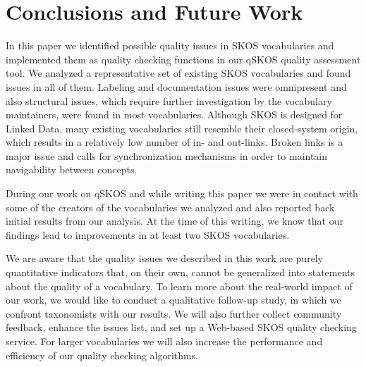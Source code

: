 \section{Conclusions and Future Work}\label{sec:conclusions}

In this paper we identified possible quality issues in SKOS vocabularies and implemented them as quality checking functions in our qSKOS quality assessment tool. We analyzed a representative set of existing SKOS vocabularies and found  issues in all of them. Labeling and documentation issues were omnipresent and also structural issues, which require further investigation by the vocabulary maintainers, were found in most vocabularies. Although SKOS is designed for Linked Data, many existing vocabularies still resemble their closed-system origin, which results in a relatively low number of in- and out-links. Broken links is a major issue and calls for synchronization mechanisms in order to maintain navigability between concepts.

During our work on qSKOS and while writing this paper we were in contact with some of the creators of the vocabularies we analyzed and also reported back initial results from our analysis. At the time of this writing, we know that our findings lead to improvements in at least two SKOS vocabularies.

We are aware that the quality issues we described in this work are purely quantitative indicators that, on their own, cannot be generalized into statements about the quality of a vocabulary. To learn more about the real-world impact of our work, we would like to conduct a qualitative follow-up study, in which we confront taxonomists with our results. We will also further collect community feedback, enhance the issues list, and set up a Web-based SKOS quality checking service. For larger vocabularies we will also increase the performance and efficiency of our quality checking algorithms.